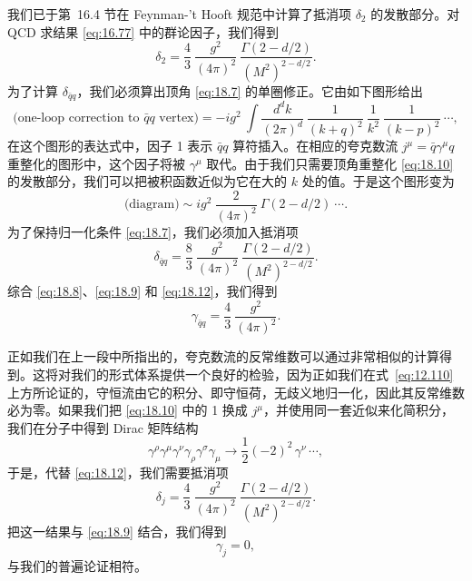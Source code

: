 我们已于第~16.4 节在 Feynman-'t Hooft 规范中计算了抵消项 $\delta_2$ 的发散部分。对 QCD 求结果 \eqref{eq:16.77} 中的群论因子，我们得到
\begin{equation}
  \delta_2 = \frac{4}{3}\ \frac{g^2}{(4\pi)^2}\ \frac{\Gamma(2-d/2)}
    {(M^2)^{2-d/2}} .
  \label{eq:18.9}
\end{equation}
为了计算 $\delta_{\bar{q}q}$，我们必须算出顶角 \eqref{eq:18.7} 的单圈修正。它由如下图形给出
\begin{equation}
  \text{(one-loop correction to } \bar{q}q \text{ vertex)}
  = -ig^2\ \int \frac{d^dk}{(2\pi)^d}\ \frac{1}{(k+q)^2}\ \frac{1}{k^2}\
    \frac{1}{(k-p)^2}\ \cdots ,
  \label{eq:18.10}
\end{equation}
在这个图形的表达式中，因子 1 表示 $\bar{q}q$ 算符插入。在相应的夸克数流 $j^\mu = \bar{q}\gamma^\mu q$ 重整化的图形中，这个因子将被 $\gamma^\mu$ 取代。由于我们只需要顶角重整化 \eqref{eq:18.10} 的发散部分，我们可以把被积函数近似为它在大的 $k$ 处的值。于是这个图形变为
\begin{equation}
  \text{(diagram)} \sim ig^2\ \frac{2}{(4\pi)^2}\ \Gamma(2-d/2)\ \cdots .
  \label{eq:18.11}
\end{equation}
为了保持归一化条件 \eqref{eq:18.7}，我们必须加入抵消项
\begin{equation}
  \delta_{\bar{q}q} = \frac{8}{3}\ \frac{g^2}{(4\pi)^2}\ \frac{\Gamma(2-d/2)}
    {(M^2)^{2-d/2}} .
  \label{eq:18.12}
\end{equation}
综合 \eqref{eq:18.8}、\eqref{eq:18.9} 和 \eqref{eq:18.12}，我们得到
\begin{equation}
  \gamma_{\bar{q}q} = \frac{4}{3}\ \frac{g^2}{(4\pi)^2} .
  \label{eq:18.13}
\end{equation}

正如我们在上一段中所指出的，夸克数流的反常维数可以通过非常相似的计算得到。这将对我们的形式体系提供一个良好的检验，因为正如我们在式~\eqref{eq:12.110} 上方所论证的，守恒流由它的积分、即守恒荷，无歧义地归一化，因此其反常维数必为零。如果我们把 \eqref{eq:18.10} 中的 1 换成 $j^\mu$，并使用同一套近似来化简积分，我们在分子中得到 Dirac 矩阵结构
\begin{equation}
  \gamma^\rho\gamma^\mu\gamma^\nu\gamma_\rho\gamma^\sigma\gamma_\mu
  \to \frac{1}{2}(-2)^2\,\gamma^\nu\,\cdots ,
  \label{eq:18.14}
\end{equation}
于是，代替 \eqref{eq:18.12}，我们需要抵消项
\begin{equation}
  \delta_j = \frac{4}{3}\ \frac{g^2}{(4\pi)^2}\ \frac{\Gamma(2-d/2)}
    {(M^2)^{2-d/2}} .
  \label{eq:18.15}
\end{equation}
把这一结果与 \eqref{eq:18.9} 结合，我们得到
\begin{equation}
  \gamma_j = 0 ,
  \label{eq:18.16}
\end{equation}
与我们的普遍论证相符。

